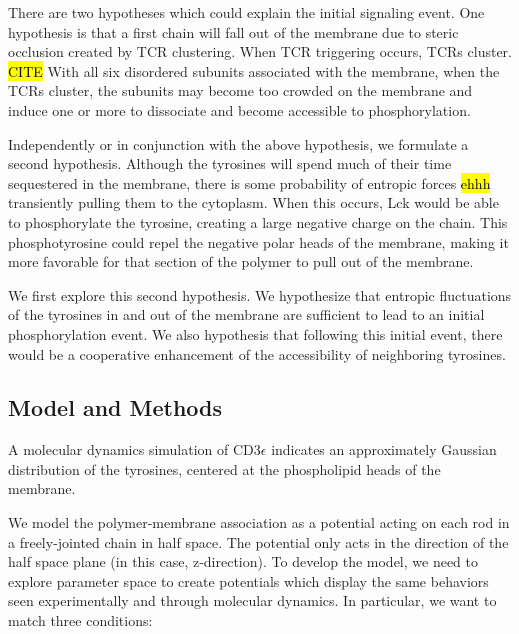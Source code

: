 \documentclass[../../AdvancementSummary.tex]{subfiles}
\begin{document}
There are two hypotheses which could explain the initial signaling event. One hypothesis is that a first chain will fall out of the membrane due to steric occlusion created by TCR clustering. When TCR triggering occurs, TCRs cluster. \hl{CITE} With all six disordered subunits associated with the membrane, when the TCRs cluster, the subunits may become too crowded on the membrane and induce one or more to dissociate and become accessible to phosphorylation. 

Independently or in conjunction with the above hypothesis, we formulate a second hypothesis. Although the tyrosines will spend much of their time sequestered in the membrane, there is some probability of entropic forces \hl{ehhh} transiently pulling them to the cytoplasm. When this occurs, Lck would be able to phosphorylate the tyrosine, creating a large negative charge on the chain. This phosphotyrosine could repel the negative polar heads of the membrane, making it more favorable for that section of the polymer to pull out of the membrane.  

We first explore this second hypothesis. We hypothesize that entropic fluctuations of the tyrosines in and out of the membrane are sufficient to lead to an initial phosphorylation event. We also hypothesis that following this initial event, there would be a cooperative enhancement of the accessibility of neighboring tyrosines.


\subsection{Model and Methods}


A molecular dynamics simulation of CD3$\epsilon$ indicates an approximately Gaussian distribution of the tyrosines, centered at the phospholipid heads of the membrane. \cite{Lopez2015}

We model the polymer-membrane association as a potential acting on each rod in a freely-jointed chain in half space. The potential only acts in the direction of the half space plane (in this case, z-direction). To develop the model, we need to explore parameter space to create potentials which display the same behaviors seen experimentally and through molecular dynamics. In particular, we want to match three conditions:
\end{document}
